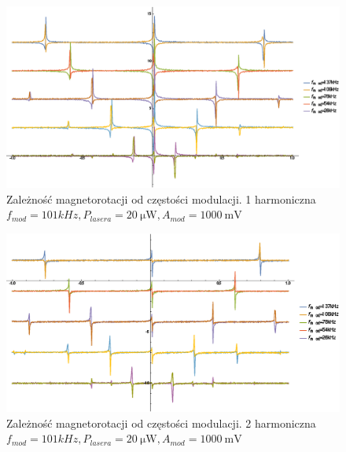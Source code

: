 \documentclass[a4paper,10pt,twoside]{report}
\begin{document}
\begin{figure}[h!]
\centering
 \includegraphics[width=\textwidth]{panoramy_1H_odf.eps}
 \caption{Zależność magnetorotacji od częstości modulacji. 1 harmoniczna $f_{mod}=101kHz, P_{lasera}=20~\mathrm{ \mu W}, A_{mod}=1000~\mathrm{mV}$}
 \label{fig:panodf1}
\end{figure}

\begin{figure}[h!]
\centering
 \includegraphics[width=\textwidth]{panoramy_2H_odf.eps}
 \caption{Zależność magnetorotacji od częstości modulacji. 2 harmoniczna $f_{mod}=101kHz, P_{lasera}=20~\mathrm{ \mu W}, A_{mod}=1000~\mathrm{mV}$}
 \label{fig:panodf2}
\end{figure}
\end{document}

